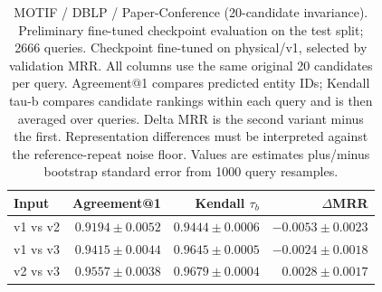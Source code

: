 \begin{table}[t]
\centering
\small
\begin{tabular}{lrrr}
\toprule
Input & Agreement@1 & Kendall $\tau_b$ & $\Delta$MRR \\
\midrule
v1 vs v2 & $0.9194 \pm 0.0052$ & $0.9444 \pm 0.0006$ & $-0.0053 \pm 0.0023$ \\
v1 vs v3 & $0.9415 \pm 0.0044$ & $0.9645 \pm 0.0005$ & $-0.0024 \pm 0.0018$ \\
v2 vs v3 & $0.9557 \pm 0.0038$ & $0.9679 \pm 0.0004$ & $0.0028 \pm 0.0017$ \\
\bottomrule
\end{tabular}
\caption{MOTIF / DBLP / Paper-Conference (20-candidate invariance). Preliminary fine-tuned checkpoint evaluation on the test split; 2666 queries. Checkpoint fine-tuned on physical/v1, selected by validation MRR. All columns use the same original 20 candidates per query. Agreement@1 compares predicted entity IDs; Kendall tau-b compares candidate rankings within each query and is then averaged over queries. Delta MRR is the second variant minus the first. Representation differences must be interpreted against the reference-repeat noise floor. Values are estimates plus/minus bootstrap standard error from 1000 query resamples.}
\label{tab:motif-paper_conference-invariance}
\end{table}
